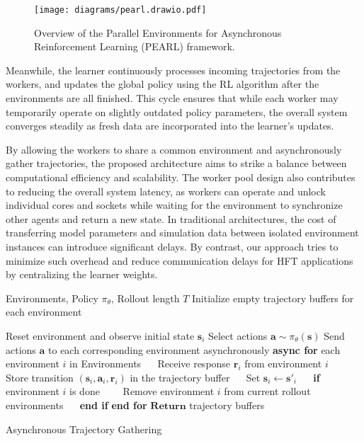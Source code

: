     \begin{figure}[htb]
        \centering
        \texttt{[image: diagrams/pearl.drawio.pdf]}
        \caption{Overview of the Parallel Environments for Asynchronous Reinforcement Learning (PEARL) framework.}
        \label{fig:pearl_architecture}
    \end{figure}

    Meanwhile, the learner continuously processes incoming trajectories from the workers,
    and updates the global policy using the RL algorithm after the environments are all finished.
    This cycle ensures that while each worker may temporarily operate on slightly outdated policy parameters,
    the overall system converges steadily as fresh data are incorporated into the learner's updates.

    By allowing the workers to share a common environment and asynchronously gather trajectories,
    the proposed architecture aims to strike a balance between computational efficiency and scalability.
    The worker pool design also contributes to reducing the overall system latency,
    as workers can operate and unlock individual cores and sockets while waiting for the environment to synchronize other agents and return a new state.
    In traditional architectures, the cost of transferring model parameters and simulation data between isolated environment instances can introduce significant delays.
    By contrast, our approach tries to minimize such overhead and reduce communication delays for HFT applications by centralizing the learner weights.

    \begin{algorithm}
        \begin{algorithmic}[1]
            \Require Environments, Policy $\pi_{\theta}$, Rollout length $T$
            \State Initialize empty trajectory buffers for each environment

                \State Reset environment and observe initial state $\mathbf{s}_i$
            \EndFor
                \State Select actions $\mathbf{a} \sim \pi_{\theta}(\mathbf{s})$
                \State Send actions $\mathbf{a}$ to each corresponding environment asynchronously
                \State \textbf{async for} {each environment $i$ in Environments}
                \State $\quad$ Receive response $\mathbf{r}_i$ from environment $i$
                \State $\quad$ Store transition $(\mathbf{s}_i, \mathbf{a}_i, \mathbf{r}_i)$ in the trajectory buffer
                \State $\quad$ Set $\mathbf{s}_i \leftarrow \mathbf{s'}_i$
                \State $\quad$ \textbf{if} environment $i$ is done
                \State $\quad$$\quad$Remove environment $i$ from current rollout environments
                \State $\quad$ \textbf{end if}
                \State \textbf{end for}
            \EndFor
            \State $\textbf{Return}$ trajectory buffers
        \end{algorithmic}
        \caption{Asynchronous Trajectory Gathering}
        \label{alg:trajectory}
    \end{algorithm}

